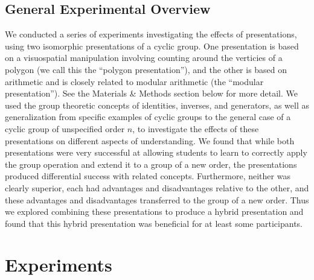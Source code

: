 \documentclass[man,10pt]{apa6}
\begin{document}
\subsection{General Experimental Overview}
We conducted a series of experiments investigating the effects of presentations, using two isomorphic presentations of a cyclic group. One presentation is based on a visuospatial manipulation involving counting around the verticies of a polygon (we call this the ``polygon presentation''), and the other is based on arithmetic and is closely related to modular arithmetic (the ``modular presentation''). See the Materials \& Methods section below for more detail. We used the group theoretic concepts of identities, inverses, and generators, as well as generalization from specific examples of cyclic groups to the general case of a cyclic group of unspecified order $n$, to investigate the effects of these presentations on different aspects of understanding. We found that while both presentations were very successful at allowing students to learn to correctly apply the group operation and extend it to a group of a new order, the presentations produced differential success with related concepts. Furthermore, neither was clearly superior, each had advantages and disadvantages relative to the other, and these advantages and disadvantages transferred to the group of a new order. Thus we explored combining these presentations to produce a hybrid presentation and found that this hybrid presentation was beneficial for at least some participants. 
\section{Experiments}
\end{document}
